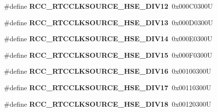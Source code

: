 \begin{DoxyCompactItemize}
\item 
\mbox{\label{group___r_c_c___r_t_c___clock___source_ga06837111cb6294d55f681347514a233d}} 
\#define {\bfseries R\+C\+C\+\_\+\+R\+T\+C\+C\+L\+K\+S\+O\+U\+R\+C\+E\+\_\+\+H\+S\+E\+\_\+\+D\+I\+V12}~0x000\+C0300U
\item 
\mbox{\label{group___r_c_c___r_t_c___clock___source_ga2c447a815f2e116f88b604eeaa7aab0b}} 
\#define {\bfseries R\+C\+C\+\_\+\+R\+T\+C\+C\+L\+K\+S\+O\+U\+R\+C\+E\+\_\+\+H\+S\+E\+\_\+\+D\+I\+V13}~0x000\+D0300U
\item 
\mbox{\label{group___r_c_c___r_t_c___clock___source_ga5dceac607cd03d87002cdb78b3234941}} 
\#define {\bfseries R\+C\+C\+\_\+\+R\+T\+C\+C\+L\+K\+S\+O\+U\+R\+C\+E\+\_\+\+H\+S\+E\+\_\+\+D\+I\+V14}~0x000\+E0300U
\item 
\mbox{\label{group___r_c_c___r_t_c___clock___source_ga9594f8553a259c18fb354e903c01b041}} 
\#define {\bfseries R\+C\+C\+\_\+\+R\+T\+C\+C\+L\+K\+S\+O\+U\+R\+C\+E\+\_\+\+H\+S\+E\+\_\+\+D\+I\+V15}~0x000\+F0300U
\item 
\mbox{\label{group___r_c_c___r_t_c___clock___source_ga48e1ffd844b9e9192c5d7dbeed20765f}} 
\#define {\bfseries R\+C\+C\+\_\+\+R\+T\+C\+C\+L\+K\+S\+O\+U\+R\+C\+E\+\_\+\+H\+S\+E\+\_\+\+D\+I\+V16}~0x00100300U
\item 
\mbox{\label{group___r_c_c___r_t_c___clock___source_ga62707003a86f4c4747ae89af2e561e0c}} 
\#define {\bfseries R\+C\+C\+\_\+\+R\+T\+C\+C\+L\+K\+S\+O\+U\+R\+C\+E\+\_\+\+H\+S\+E\+\_\+\+D\+I\+V17}~0x00110300U
\item 
\mbox{\label{group___r_c_c___r_t_c___clock___source_ga264428cbc7bc54bfcd794a4027ac1f5e}} 
\#define {\bfseries R\+C\+C\+\_\+\+R\+T\+C\+C\+L\+K\+S\+O\+U\+R\+C\+E\+\_\+\+H\+S\+E\+\_\+\+D\+I\+V18}~0x00120300U
\item 
\mbox{\label{group___r_c_c___r_t_c___clock___source_gaf2d8f6e3e5887bb5c853944fd35b677a}} 

\end{DoxyCompactItemize}
